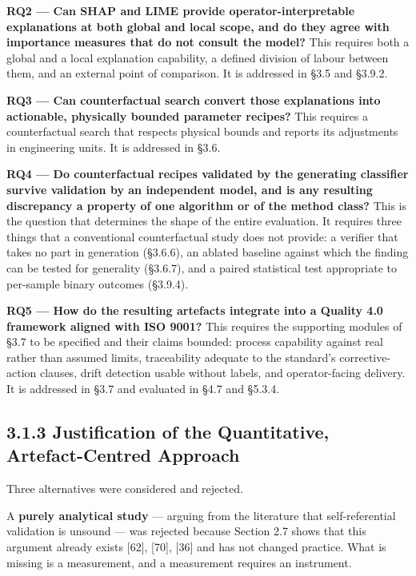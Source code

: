 \textbf{RQ2 --- Can SHAP and LIME provide operator-interpretable explanations at both global and local scope, and do they agree with importance measures that do not consult the model?} This requires both a global and a local explanation capability, a defined division of labour between them, and an external point of comparison. It is addressed in §3.5 and §3.9.2.

\textbf{RQ3 --- Can counterfactual search convert those explanations into actionable, physically bounded parameter recipes?} This requires a counterfactual search that respects physical bounds and reports its adjustments in engineering units. It is addressed in §3.6.

\textbf{RQ4 --- Do counterfactual recipes validated by the generating classifier survive validation by an independent model, and is any resulting discrepancy a property of one algorithm or of the method class?} This is the question that determines the shape of the entire evaluation. It requires three things that a conventional counterfactual study does not provide: a verifier that takes no part in generation (§3.6.6), an ablated baseline against which the finding can be tested for generality (§3.6.7), and a paired statistical test appropriate to per-sample binary outcomes (§3.9.4).

\textbf{RQ5 --- How do the resulting artefacts integrate into a Quality 4.0 framework aligned with ISO 9001?} This requires the supporting modules of §3.7 to be specified and their claims bounded: process capability against real rather than assumed limits, traceability adequate to the standard's corrective-action clauses, drift detection usable without labels, and operator-facing delivery. It is addressed in §3.7 and evaluated in §4.7 and §5.3.4.

\hypertarget{justification-of-the-quantitative-artefact-centred-approach}{%
\subsection{3.1.3 Justification of the Quantitative, Artefact-Centred Approach}\label{justification-of-the-quantitative-artefact-centred-approach}}

Three alternatives were considered and rejected.

A \textbf{purely analytical study} --- arguing from the literature that self-referential validation is unsound --- was rejected because Section 2.7 shows that this argument already exists {[}62{]}, {[}70{]}, {[}36{]} and has not changed practice. What is missing is a measurement, and a measurement requires an instrument.

